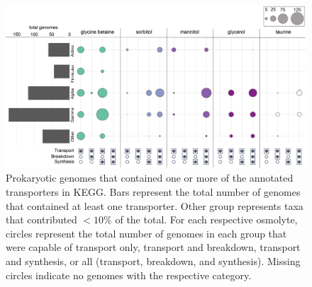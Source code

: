 \documentclass[utf8]{frontiersSCNS} %
\begin{document}
\begin{figure}[b!]
    \centering
    \includegraphics[width = 0.9\columnwidth]{Figures/transportersummary-01.png}
    \caption{Prokaryotic genomes that contained one or more of the annotated transporters in KEGG. Bars represent the total number of genomes that contained at least one transporter. Other group represents taxa that contributed $<10\%$ of the total. For each respective osmolyte, circles represent the total number of genomes in each group that were capable of transport only, transport and breakdown, transport and synthesis, or all (transport, breakdown, and synthesis). Missing circles indicate no genomes with the respective category.  }
    \label{fig:transporters}
\end{figure}
\end{document}
